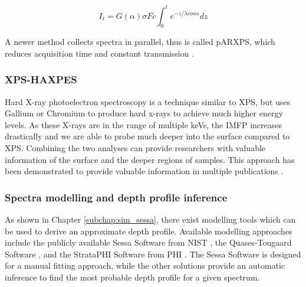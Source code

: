 \begin{equation}
\label{intensity_angle}
    I_{t} = G(\alpha)\sigma F c \int_{0}^{t} e^{-z/ \lambda cos \alpha} dz
\end{equation}

A newer method collects spectra in parallel, thus is called pARXPS, which reduces acquisition time and constant transmission \cite{bure_assessing_2023, sodhi_surface_2017}.

\subsubsection{XPS-HAXPES}
Hard X-ray photoelectron spectroscopy is a technique similar to XPS, but uses Gallium or Chromium to produce hard x-rays to achieve much higher energy levels. As these X-rays are in the range of multiple keVs, the IMFP increases drastically and we are able to probe much deeper into the surface compared to XPS. Combining the two analyses can provide researchers with valuable information of the surface and the deeper regions of samples. This approach has been demonstrated to provide valuable information in multiple publications \cite{bure_assessing_2023, siol_concepts_2020}. 

\subsubsection{Spectra modelling and depth profile inference}
As shown in Chapter \ref{subchap:sim_sessa}, there exist modelling tools which can be used to derive an approximate depth profile. Available modelling approaches include the publicly available Sessa Software from NIST \cite{smekal_simulation_2005}, the Quases-Tougaard Software \cite{zborowski_comparison_2022}, and the StrataPHI Software from PHI \cite{noauthor_updated_nodate}. The Sessa Software is designed for a manual fitting approach, while the other solutions provide an automatic inference to find the most probable depth profile for a given spectrum.